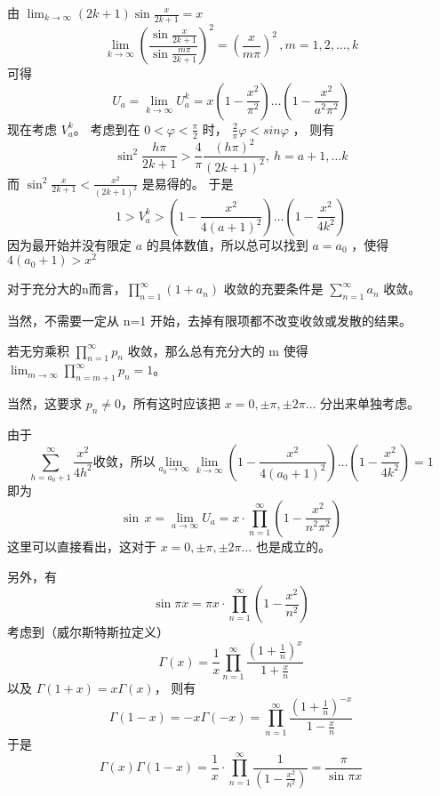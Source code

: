 由  $\lim_{k\rightarrow\infty}(2k+1)\sin\frac{x}{2k+1}=x$
\begin{equation}
\lim_{k\rightarrow\infty}\left( \frac{\sin\frac{x}{2k+1}}{\sin\frac{m\pi}{2k+1}} \right)^2=\left( \frac{x}{m\pi} \right)^2\,,m=1,2,\dots,k
\end{equation}
可得
\begin{equation}
U_a=\lim_{k\rightarrow\infty}U^k_a=x(1-\frac{x^2}{\pi^2})\dots(1-\frac{x^2}{a^2\pi^2})
\end{equation}
现在考虑 $V^k_a$。 考虑到在 $0<\varphi<\frac\pi2 $ 时， $\frac2\pi\varphi<sin\varphi$ ，
则有
\begin{equation}
\sin^2\frac {h\pi}{2k+1}>\frac4\pi\frac{(h\pi)^2}{(2k+1)^2},\ h=a+1,\dots k 
\end{equation}
而 $\sin^2\frac x{2k+1}<\frac{x^2}{(2k+1)^2}$ 是易得的。 于是
\begin{equation}
1>V^k_a>(1-\frac{x^2}{4(a+1)^2})\dots(1-\frac{x^2}{4k^2})
\end{equation}
因为最开始并没有限定 $a$ 的具体数值，所以总可以找到 $a=a_0$ ，使得 $4(a_0+1)>x^2$
\begin{lemma}{}
对于充分大的n而言，$\prod_{n=1}^{\infty}(1+a_n) $ 收敛的充要条件是  $\sum_{n=1}^{\infty}{a_n}$ 收敛。
\end{lemma}
当然，不需要一定从 n=1 开始，去掉有限项都不改变收敛或发散的结果。
\begin{lemma}{}
若无穷乘积 $\prod_{n=1}^{\infty}p_n$ 收敛，那么总有充分大的 m 使得 $\lim_{m\rightarrow\infty}\prod_{n=m+1}^{\infty}p_n=1$。
\end{lemma}
当然，这要求 $ p_n\ne0 $，所有这时应该把 $ x=0,\pm\pi,\pm 2\pi\dots $ 分出来单独考虑。

由于
\begin{equation}
\sum_{h=a_0+1}^{\infty}{\frac{x^2}{4h^2}} \text{收敛，所以} \lim_{a_0\rightarrow\infty}\lim_{k\rightarrow\infty}(1-\frac{x^2}{4(a_0+1)^2})\dots(1-\frac{x^2}{4k^2})=1
\end{equation}
即为
\begin{equation}
\sin\,x=\lim_{a\rightarrow\infty}U_a=x\cdot \prod_{n=1}^{\infty}(1-\frac{x^2}{n^2\pi^2})
\end{equation}
这里可以直接看出，这对于 $x=0,\pm\pi,\pm 2\pi\dots $ 也是成立的。

另外，有
\begin{equation}
\sin\pi x=\pi x\cdot \prod_{n=1}^{\infty}(1-\frac{x^2}{n^2})
\end{equation}
考虑到（威尔斯特斯拉定义）
\begin{equation}
\Gamma(x)=\frac1x\prod_{n=1}^{\infty}\frac{(1+\frac1n)^{x}}{1+\frac xn}
\end{equation}
以及 $ \Gamma(1+x)=x\Gamma(x)$， 则有
\begin{equation}
\Gamma(1-x)=-x\Gamma(-x)=\prod_{n=1}^{\infty}\frac{(1+\frac1n)^{-x}}{1-\frac xn}
\end{equation}
于是
\begin{equation}
\Gamma(x)\Gamma(1-x)=\frac{1}{x}\cdot \prod_{n=1}^{\infty}\frac1{(1-\frac{x^2}{n^2})}=\frac\pi{\sin\pi x}
\end{equation}

